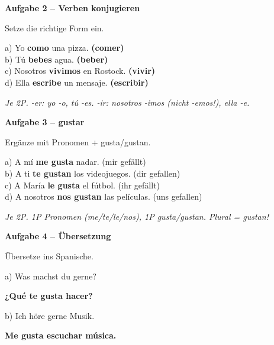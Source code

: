 \documentclass[11pt, a4paper]{article}
\newcommand{\fachfarbe}{spanisch}
\newcommand{\punktebox}[1]{\hfill\fbox{\small \_/#1}}
\newcommand{\lsg}[1]{\textcolor{loesung}{\textbf{#1}}}
\newenvironment{aufgabe}[1]{%
    \needspace{5\baselineskip}%
    \nopagebreak[4]%
    \vspace{10pt}
    \noindent\textbf{\textcolor{\fachfarbe}{Aufgabe #1}}
    \nopagebreak[4]%
    \vspace{5pt}
    \nopagebreak[4]%
    \begin{list}{}{\leftmargin=0pt}
    \item[]
}{%
    \end{list}
}
\newcommand{\er}[1]{\textcolor{erfarbe}{\textbf{#1}}}
\newcommand{\ir}[1]{\textcolor{irfarbe}{\textbf{#1}}}
\begin{document}
\begin{aufgabe}{2 -- Verben konjugieren}
Setze die richtige Form ein. \punktebox{8}
\end{aufgabe}

\noindent
a) Yo \lsg{como} una pizza. \er{(comer)}\\[1em]
b) Tú \lsg{bebes} agua. \er{(beber)}\\[1em]
c) Nosotros \lsg{vivimos} en Rostock. \ir{(vivir)}\\[1em]
d) Ella \lsg{escribe} un mensaje. \ir{(escribir)}

\textit{\textcolor{grau}{Je 2P. -er: yo -o, tú -es. -ir: nosotros -imos (nicht -emos!), ella -e.}}

\vspace{15pt}


\begin{aufgabe}{3 -- gustar}
Ergänze mit Pronomen + gusta/gustan. \punktebox{8}
\end{aufgabe}

\noindent
a) A mí \lsg{me gusta} nadar. (mir gefällt)\\[1em]
b) A ti \lsg{te gustan} los videojuegos. (dir gefallen)\\[1em]
c) A María \lsg{le gusta} el fútbol. (ihr gefällt)\\[1em]
d) A nosotros \lsg{nos gustan} las películas. (uns gefallen)

\textit{\textcolor{grau}{Je 2P. 1P Pronomen (me/te/le/nos), 1P gusta/gustan. Plural = gustan!}}

\vspace{15pt}


\begin{aufgabe}{4 -- Übersetzung}
Übersetze ins Spanische. \punktebox{8}
\end{aufgabe}

\noindent
a) Was machst du gerne?

\lsg{¿Qué te gusta hacer?}

\vspace{1em}

\noindent
b) Ich höre gerne Musik.

\lsg{Me gusta escuchar música.}
\end{document}
